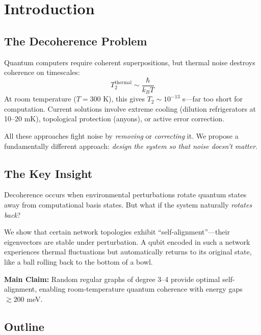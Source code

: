 \documentclass[11pt,a4paper]{article}
\theoremstyle{plain}
\theoremstyle{definition}
\theoremstyle{remark}
\begin{document}
\tableofcontents
\newpage

\section{Introduction}

\subsection{The Decoherence Problem}

Quantum computers require coherent superpositions, but thermal noise destroys coherence on timescales:
\begin{equation}
T_2^{\text{thermal}} \sim \frac{\hbar}{k_B T}
\end{equation}
At room temperature ($T = 300$ K), this gives $T_2 \sim 10^{-13}$ s---far too short for computation. Current solutions involve extreme cooling (dilution refrigerators at 10--20 mK), topological protection (anyons), or active error correction.

All these approaches fight noise by \emph{removing} or \emph{correcting} it. We propose a fundamentally different approach: \emph{design the system so that noise doesn't matter}.

\subsection{The Key Insight}

Decoherence occurs when environmental perturbations rotate quantum states away from computational basis states. But what if the system naturally \emph{rotates back}?

We show that certain network topologies exhibit ``self-alignment''---their eigenvectors are stable under perturbation. A qubit encoded in such a network experiences thermal fluctuations but automatically returns to its original state, like a ball rolling back to the bottom of a bowl.

\begin{keyresult}
\textbf{Main Claim:} Random regular graphs of degree 3--4 provide optimal self-alignment, enabling room-temperature quantum coherence with energy gaps $\gtrsim 200$ meV.
\end{keyresult}

\subsection{Outline}
\end{document}
